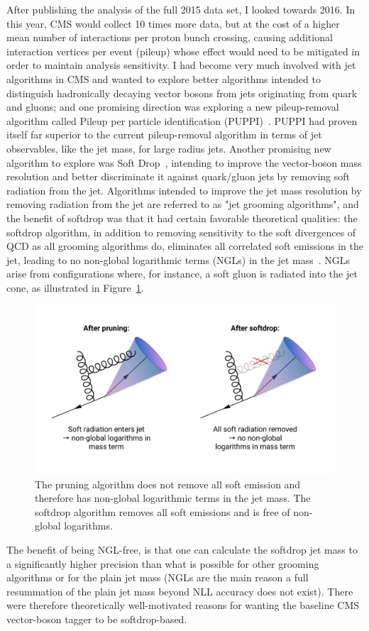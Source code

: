 \documentclass{pasa}%
\begin{document}
After publishing the analysis of the full 2015 data set, I looked towards 2016. In this year, CMS would collect 10 times more data, but at the cost of a higher mean number of interactions per proton bunch crossing, causing additional interaction vertices per event (pileup) whose effect would need to be mitigated in order to maintain analysis sensitivity. I had become very much involved with jet algorithms in CMS and wanted to explore better algorithms intended to distinguish hadronically decaying vector bosons from jets originating from quark and gluons; and one promising direction was exploring a new pileup-removal algorithm called Pileup per particle identification (PUPPI)~\cite{Bertolini2014}. PUPPI had proven itself far superior to the current pileup-removal algorithm in terms of jet observables, like the jet mass, for large radius jets. Another promising new algorithm to explore was Soft Drop~\cite{Larkoski:2014wba}, intending to improve the vector-boson mass resolution and better discriminate it against quark/gluon jets by removing soft radiation from the jet. Algorithms intended to improve the jet mass resolution by removing radiation from the jet are referred to as "jet grooming algorithms", and the benefit of softdrop was that it had certain favorable theoretical qualities: the softdrop algorithm, in addition to removing sensitivity to the soft divergences of QCD as all grooming algorithms do, eliminates all correlated soft emissions in the jet, leading to no non-global logarithmic terms (NGLs) in the jet mass~\cite{Dasgupta:2013ihk}. NGLs arise from configurations where, for instance, a soft gluon is radiated into the jet cone, as illustrated in Figure~\ref{Fig3}. 
\begin{figure}[h!]
\centering
 \includegraphics[width=\columnwidth]{figures//ngls.pdf}
\caption{The pruning algorithm does not remove all soft emission and therefore has non-global logarithmic terms in the jet mass. The softdrop algorithm removes all soft emissions and is free of non-global logarithms.}
\label{Fig3}
\end{figure}
The benefit of being NGL-free, is that one can calculate the softdrop jet mass to a significantly higher precision than what is possible for other grooming algorithms or for the plain jet mass (NGLs are the main reason a full resummation of the plain jet mass beyond NLL accuracy does not exist). There were therefore theoretically well-motivated reasons for wanting the baseline CMS vector-boson tagger to be softdrop-based.
\end{document}
